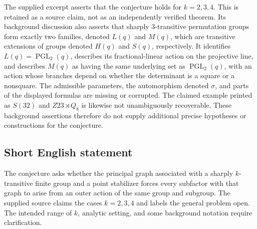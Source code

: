 \documentclass[11pt]{article}
\begin{document}
The supplied excerpt asserts that the conjecture holds for \(k=2,3,4\). This is retained as a source claim, not as an independently verified theorem. Its background discussion also asserts that sharply \(3\)-transitive permutation groups form exactly two families, denoted \(L(q)\) and \(M(q)\), which are transitive extensions of groups denoted \(H(q)\) and \(S(q)\), respectively. It identifies \(L(q)=\operatorname{PGL}_2(q)\), describes its fractional-linear action on the projective line, and describes \(M(q)\) as having the same underlying set as \(\operatorname{PGL}_2(q)\), with an action whose branches depend on whether the determinant is a square or a nonsquare. The admissible parameters, the automorphism denoted \(\sigma\), and parts of the displayed formulas are missing or corrupted. The claimed example printed as \(S(32)\) and \(Z23\rtimes Q_8\) is likewise not unambiguously recoverable. These background assertions therefore do not supply additional precise hypotheses or constructions for the conjecture.
\subsection{Short English statement}
The conjecture asks whether the principal graph associated with a sharply \(k\)-transitive finite group and a point stabilizer forces every subfactor with that graph to arise from an outer action of the same group and subgroup. The supplied source claims the cases \(k=2,3,4\) and labels the general problem open. The intended range of \(k\), analytic setting, and some background notation require clarification.
\end{document}
